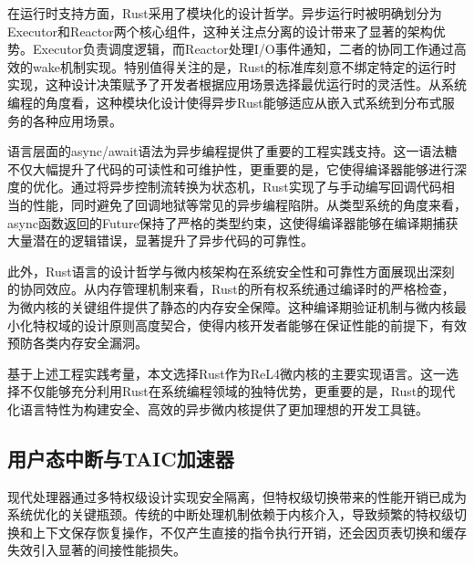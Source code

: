 在运行时支持方面，Rust采用了模块化的设计哲学\cite{klabnik2020rust}。异步运行时被明确划分为Executor和Reactor两个核心组件\cite{moslehianexperimental}，这种关注点分离的设计带来了显著的架构优势。Executor负责调度逻辑，而Reactor处理I/O事件通知，二者的协同工作通过高效的wake机制实现。特别值得关注的是，Rust的标准库刻意不绑定特定的运行时实现\cite{rust2021std}，这种设计决策赋予了开发者根据应用场景选择最优运行时的灵活性。从系统编程的角度看，这种模块化设计使得异步Rust能够适应从嵌入式系统到分布式服务的各种应用场景。

语言层面的async/await语法为异步编程提供了重要的工程实践支持\cite{matsakis2018async}。这一语法糖不仅大幅提升了代码的可读性和可维护性，更重要的是，它使得编译器能够进行深度的优化。通过将异步控制流转换为状态机，Rust实现了与手动编写回调代码相当的性能，同时避免了回调地狱等常见的异步编程陷阱\cite{edwards2009coherent}。从类型系统的角度来看，async函数返回的Future保持了严格的类型约束，这使得编译器能够在编译期捕获大量潜在的逻辑错误，显著提升了异步代码的可靠性。

此外，Rust语言的设计哲学与微内核架构在系统安全性和可靠性方面展现出深刻的协同效应。从内存管理机制来看，Rust的所有权系统通过编译时的严格检查\cite{levy2015ownership}，为微内核的关键组件提供了静态的内存安全保障。这种编译期验证机制与微内核最小化特权域的设计原则高度契合，使得内核开发者能够在保证性能的前提下，有效预防各类内存安全漏洞。

基于上述工程实践考量，本文选择Rust作为ReL4微内核的主要实现语言。这一选择不仅能够充分利用Rust在系统编程领域的独特优势，更重要的是，Rust的现代化语言特性为构建安全、高效的异步微内核提供了更加理想的开发工具链。

\subsection{用户态中断与TAIC加速器}

现代处理器通过多特权级设计实现安全隔离\cite{waterman2016riscv}，但特权级切换带来的性能开销已成为系统优化的关键瓶颈。传统的中断处理机制依赖于内核介入\cite{bovet2005understanding}，导致频繁的特权级切换和上下文保存恢复操作，不仅产生直接的指令执行开销，还会因页表切换和缓存失效引入显著的间接性能损失\cite{gotzfried2017cache}。

